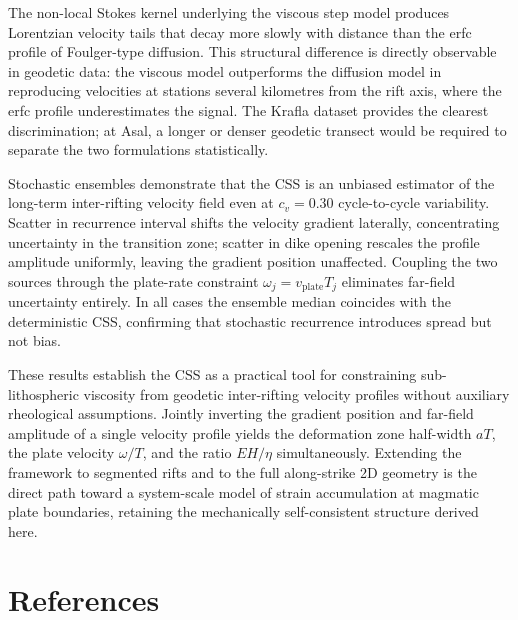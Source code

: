\documentclass[12pt]{article}
\begin{document}
The non-local Stokes kernel underlying the viscous step model produces
Lorentzian velocity tails that decay more slowly with distance than the
erfc profile of Foulger-type diffusion.  This structural difference is
directly observable in geodetic data: the viscous model outperforms the
diffusion model in reproducing velocities at stations several kilometres
from the rift axis, where the erfc profile underestimates the signal.  The
Krafla dataset provides the clearest discrimination; at Asal, a longer or
denser geodetic transect would be required to separate the two formulations
statistically.

Stochastic ensembles demonstrate that the CSS is an unbiased estimator of
the long-term inter-rifting velocity field even at $c_v = 0.30$
cycle-to-cycle variability.  Scatter in recurrence interval shifts the
velocity gradient laterally, concentrating uncertainty in the transition
zone; scatter in dike opening rescales the profile amplitude uniformly,
leaving the gradient position unaffected.  Coupling the two sources through
the plate-rate constraint $\omega_j = v_{\mathrm{plate}} T_j$ eliminates
far-field uncertainty entirely.  In all cases the ensemble median coincides
with the deterministic CSS, confirming that stochastic recurrence introduces
spread but not bias.

These results establish the CSS as a practical tool for constraining
sub-lithospheric viscosity from geodetic inter-rifting velocity profiles
without auxiliary rheological assumptions.  Jointly inverting the gradient
position and far-field amplitude of a single velocity profile yields the
deformation zone half-width $aT$, the plate velocity $\omega/T$, and the
ratio $EH/\eta$ simultaneously.  Extending the framework to segmented rifts and to the full along-strike
2D geometry is the direct path toward a system-scale model of strain
accumulation at magmatic plate boundaries, retaining the
mechanically self-consistent structure derived here.

\section*{References}
\end{document}
